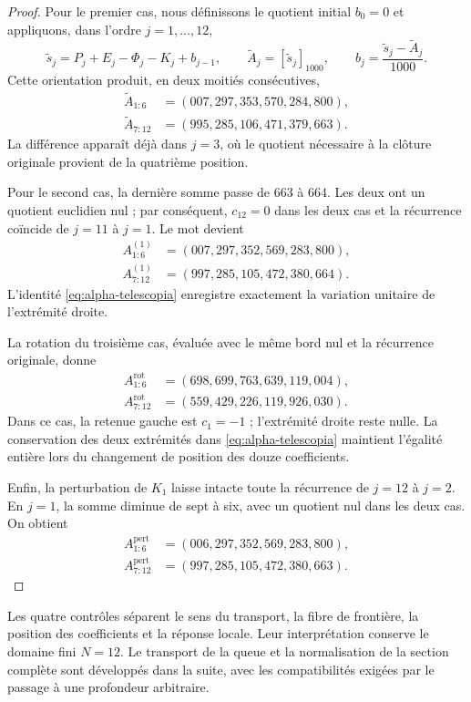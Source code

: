 \begin{proof}
Pour le premier cas, nous définissons le quotient initial \(b_0=0\) et
appliquons, dans l'ordre \(j=1,\ldots,12\),
\[
 \widetilde s_j=P_j+E_j-\Phi_j-K_j+b_{j-1},\qquad
 \widetilde A_j=[\widetilde s_j]_{1000},\qquad
 b_j=\frac{\widetilde s_j-\widetilde A_j}{1000}.
\]
Cette orientation produit, en deux moitiés consécutives,
\begin{align*}
 \widetilde A_{1:6}&=(007,297,353,570,284,800),\\
 \widetilde A_{7:12}&=(995,285,106,471,379,663).
\end{align*}
La différence apparaît déjà dans \(j=3\), où le quotient nécessaire à
la clôture originale provient de la quatrième position.

Pour le second cas, la dernière somme passe de \(663\) à \(664\).
Les deux ont un quotient euclidien nul ; par conséquent, \(c_{12}=0\) dans les
deux cas et la récurrence coïncide de \(j=11\) à \(j=1\).
Le mot devient
\begin{align*}
 A^{(1)}_{1:6}&=(007,297,352,569,283,800),\\
 A^{(1)}_{7:12}&=(997,285,105,472,380,664).
\end{align*}
L'identité \eqref{eq:alpha-telescopia} enregistre exactement la variation unitaire de l'extrémité droite.

La rotation du troisième cas, évaluée avec le même bord nul et la
récurrence originale, donne
\begin{align*}
 A^{\mathrm{rot}}_{1:6}&=(698,699,763,639,119,004),\\
 A^{\mathrm{rot}}_{7:12}&=(559,429,226,119,926,030).
\end{align*}
Dans ce cas, la retenue gauche est \(c_1=-1\) ; l'extrémité droite reste nulle. La conservation des deux extrémités dans \eqref{eq:alpha-telescopia} maintient l'égalité entière lors du changement de position des douze coefficients.

Enfin, la perturbation de \(K_1\) laisse intacte toute la
récurrence de \(j=12\) à \(j=2\). En \(j=1\), la somme
diminue de sept à six, avec un quotient nul dans les deux cas. On obtient
\begin{align*}
 A^{\mathrm{pert}}_{1:6}&=(006,297,352,569,283,800),\\
 A^{\mathrm{pert}}_{7:12}&=(997,285,105,472,380,663).
\end{align*}
\end{proof}

Les quatre contrôles séparent le sens du transport, la fibre de
frontière, la position des coefficients et la réponse locale. Leur
interprétation conserve le domaine fini \(N=12\). Le transport
de la queue et la normalisation de la section complète sont développés
dans la suite, avec les compatibilités exigées par le passage à une
profondeur arbitraire.
